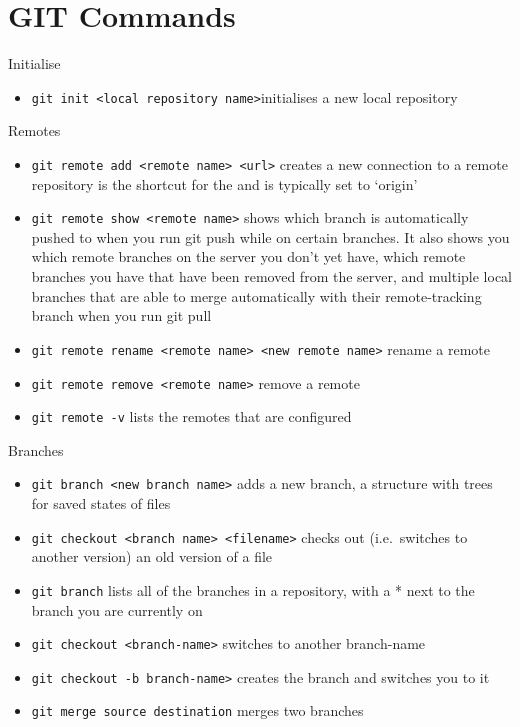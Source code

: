 \documentclass[
]{book}
\providecommand{\tightlist}{%
  \setlength{\itemsep}{0pt}\setlength{\parskip}{0pt}}
\begin{document}
\hypertarget{git-commands-1}{%
\section{GIT Commands}\label{git-commands-1}}

Initialise

\begin{itemize}
\tightlist
\item
  \texttt{git\ init\ \textless{}local\ repository\ name\textgreater{}}initialises a new local repository
\end{itemize}

Remotes

\begin{itemize}
\tightlist
\item
  \texttt{git\ remote\ add\ \textless{}remote\ name\textgreater{}\ \textless{}url\textgreater{}} creates a new connection to a remote repository is the shortcut for the and is typically set to `origin'
\item
  \texttt{git\ remote\ show\ \textless{}remote\ name\textgreater{}} shows which branch is automatically pushed to when you run git push while on certain branches. It also shows you which remote branches on the server you don't yet have, which remote branches you have that have been removed from the server, and multiple local branches that are able to merge automatically with their remote-tracking branch when you run git pull
\item
  \texttt{git\ remote\ rename\ \textless{}remote\ name\textgreater{}\ \textless{}new\ remote\ name\textgreater{}} rename a remote
\item
  \texttt{git\ remote\ remove\ \textless{}remote\ name\textgreater{}} remove a remote
\item
  \texttt{git\ remote\ -v} lists the remotes that are configured
\end{itemize}

Branches

\begin{itemize}
\tightlist
\item
  \texttt{git\ branch\ \textless{}new\ branch\ name\textgreater{}} adds a new branch, a structure with trees for saved states of files
\item
  \texttt{git\ checkout\ \textless{}branch\ name\textgreater{}\ \textless{}filename\textgreater{}} checks out (i.e.~switches to another version) an old version of a file
\item
  \texttt{git\ branch} lists all of the branches in a repository, with a * next to the branch you are currently on
\item
  \texttt{git\ checkout\ \textless{}branch-name\textgreater{}} switches to another branch-name
\item
  \texttt{git\ checkout\ -b\ branch-name\textgreater{}} creates the branch and switches you to it
\item
  \texttt{git\ merge\ source\ destination} merges two branches
\end{itemize}
\end{document}
